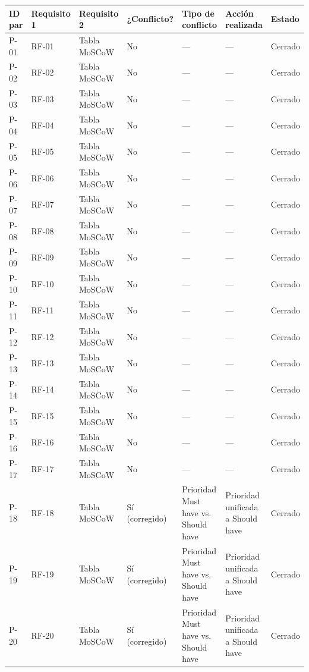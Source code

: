 \begin{tabular}{p{1.6cm}p{2.2cm}p{2.2cm}p{1.6cm}p{2.4cm}p{2.6cm}p{1.6cm}}
\hline
\textbf{ID par} &
\textbf{Requisito 1} &
\textbf{Requisito 2} &
\textbf{¿Conflicto?} &
\textbf{Tipo de conflicto} &
\textbf{Acción realizada} &
\textbf{Estado} \\
\hline

P-01 & RF-01 & Tabla MoSCoW & No & --- & --- & Cerrado \\
P-02 & RF-02 & Tabla MoSCoW & No & --- & --- & Cerrado \\
P-03 & RF-03 & Tabla MoSCoW & No & --- & --- & Cerrado \\
P-04 & RF-04 & Tabla MoSCoW & No & --- & --- & Cerrado \\
P-05 & RF-05 & Tabla MoSCoW & No & --- & --- & Cerrado \\
P-06 & RF-06 & Tabla MoSCoW & No & --- & --- & Cerrado \\
P-07 & RF-07 & Tabla MoSCoW & No & --- & --- & Cerrado \\
P-08 & RF-08 & Tabla MoSCoW & No & --- & --- & Cerrado \\
P-09 & RF-09 & Tabla MoSCoW & No & --- & --- & Cerrado \\
P-10 & RF-10 & Tabla MoSCoW & No & --- & --- & Cerrado \\
P-11 & RF-11 & Tabla MoSCoW & No & --- & --- & Cerrado \\
P-12 & RF-12 & Tabla MoSCoW & No & --- & --- & Cerrado \\
P-13 & RF-13 & Tabla MoSCoW & No & --- & --- & Cerrado \\
P-14 & RF-14 & Tabla MoSCoW & No & --- & --- & Cerrado \\
P-15 & RF-15 & Tabla MoSCoW & No & --- & --- & Cerrado \\
P-16 & RF-16 & Tabla MoSCoW & No & --- & --- & Cerrado \\
P-17 & RF-17 & Tabla MoSCoW & No & --- & --- & Cerrado \\

P-18 & RF-18 & Tabla MoSCoW & Sí (corregido) &
Prioridad Must have vs. Should have &
Prioridad unificada a Should have &
Cerrado \\

P-19 & RF-19 & Tabla MoSCoW & Sí (corregido) &
Prioridad Must have vs. Should have &
Prioridad unificada a Should have &
Cerrado \\

P-20 & RF-20 & Tabla MoSCoW & Sí (corregido) &
Prioridad Must have vs. Should have &
Prioridad unificada a Should have &
Cerrado \\


\end{tabular}
